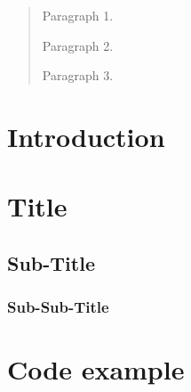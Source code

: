 \documentclass[12pt,a4paper]{article}
\begin{document}
\vspace*{\fill}
\begin{abstract}
Paragraph 1.

Paragraph 2.

Paragraph 3.
\end{abstract}
\vspace*{\fill}
\thispagestyle{empty}




\clearpage
\tableofcontents
\listoffigures
\clearpage




\setcounter{page}{1}
\section{Introduction}

\lipsum[1]




\section{Title}

\lipsum[2]


\subsection{Sub-Title}

\lipsum[3]


\subsubsection{Sub-Sub-Title}

\lipsum[5]


\newpage
\section{Code example}
\end{document}
